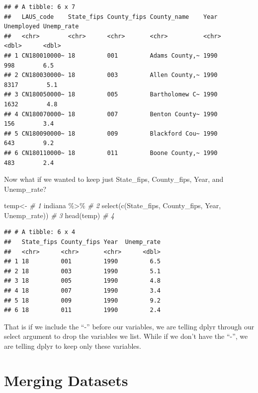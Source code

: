 \documentclass[
]{book}
\newenvironment{Shaded}{\begin{snugshade}}{\end{snugshade}}
\newcommand{\CommentTok}[1]{\textcolor[rgb]{0.56,0.35,0.01}{\textit{#1}}}
\newcommand{\FunctionTok}[1]{\textcolor[rgb]{0.00,0.00,0.00}{#1}}
\newcommand{\NormalTok}[1]{#1}
\newcommand{\OtherTok}[1]{\textcolor[rgb]{0.56,0.35,0.01}{#1}}
\newcommand{\SpecialCharTok}[1]{\textcolor[rgb]{0.00,0.00,0.00}{#1}}
\begin{document}
\begin{verbatim}
## # A tibble: 6 x 7
##   LAUS_code    State_fips County_fips County_name    Year  Unemployed Unemp_rate
##   <chr>        <chr>      <chr>       <chr>          <chr>      <dbl>      <dbl>
## 1 CN180010000~ 18         001         Adams County,~ 1990         998        6.5
## 2 CN180030000~ 18         003         Allen County,~ 1990        8317        5.1
## 3 CN180050000~ 18         005         Bartholomew C~ 1990        1632        4.8
## 4 CN180070000~ 18         007         Benton County~ 1990         156        3.4
## 5 CN180090000~ 18         009         Blackford Cou~ 1990         643        9.2
## 6 CN180110000~ 18         011         Boone County,~ 1990         483        2.4
\end{verbatim}

Now what if we wanted to keep just State\_fips, County\_fips, Year, and Unemp\_rate?

\begin{Shaded}
\begin{Highlighting}[]
\NormalTok{temp}\OtherTok{\textless{}{-}}                                                  \CommentTok{\# 1}
\NormalTok{  indiana }\SpecialCharTok{\%\textgreater{}\%}                                           \CommentTok{\# 2}
  \FunctionTok{select}\NormalTok{(}\FunctionTok{c}\NormalTok{(State\_fips, County\_fips, Year, Unemp\_rate))  }\CommentTok{\# 3}
\FunctionTok{head}\NormalTok{(temp)                                              }\CommentTok{\# 4}
\end{Highlighting}
\end{Shaded}

\begin{verbatim}
## # A tibble: 6 x 4
##   State_fips County_fips Year  Unemp_rate
##   <chr>      <chr>       <chr>      <dbl>
## 1 18         001         1990         6.5
## 2 18         003         1990         5.1
## 3 18         005         1990         4.8
## 4 18         007         1990         3.4
## 5 18         009         1990         9.2
## 6 18         011         1990         2.4
\end{verbatim}

That is if we include the ``-'' before our variables, we are telling dplyr through our select argument to drop the variables we list. While if we don't have the ``-'', we are telling dplyr to keep only these variables.

\hypertarget{merging-datasets}{%
\section{Merging Datasets}\label{merging-datasets}}
\end{document}
